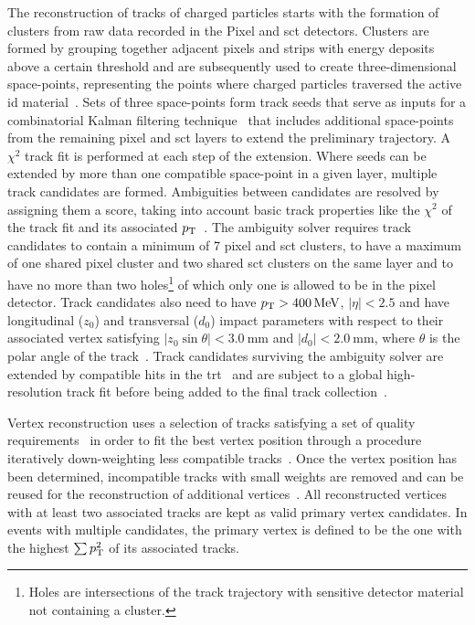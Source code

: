 The reconstruction of tracks of charged particles starts with the formation of clusters from raw data recorded in the Pixel and \gls{sct} detectors.
Clusters are formed by grouping together adjacent pixels and strips with energy deposits above a certain threshold and are subsequently used to create three-dimensional space-points, representing the points where charged particles traversed the active \gls{id} material~\cite{PERF-2015-08}.
Sets of three space-points form track seeds that serve as inputs for a combinatorial Kalman filtering technique~\cite{Fruhwirth:178627} that includes additional space-points from the remaining pixel and \gls{sct} layers to extend the preliminary trajectory.
A $\chi^2$ track fit is performed at each step of the extension.
Where seeds can be extended by more than one compatible space-point in a given layer, multiple track candidates are formed.
Ambiguities between candidates are resolved by assigning them a score, taking into account basic track properties like the $\chi^2$ of the track fit and its associated $p_{\mathrm{T}}$~\cite{PERF-2015-08}.
The ambiguity solver requires track candidates to contain a minimum of 7 pixel and \gls{sct} clusters, to have a maximum of one shared pixel cluster and two shared \gls{sct} clusters on the same layer and to have no more than two holes\footnote{Holes are intersections of the track trajectory with sensitive detector material not containing a cluster.} of which only one is allowed to be in the pixel detector.
Track candidates also need to have $\pt > \SI{400}{\MeV}$, $\vert\eta\vert < 2.5$ and have longitudinal ($z_0$) and transversal ($d_0$) impact parameters with respect to their associated vertex satisfying $\vert z_0 \sin\theta \vert < \SI{3.0}{\milli\meter}$ and $\vert d_0 \vert < \SI{2.0}{\milli\meter}$, where $\theta$ is the polar angle of the track~\cite{PERF-2015-08}.
Track candidates surviving the ambiguity solver are extended by compatible hits in the \gls{trt}~\cite{Cornelissen:1176900} and are subject to a global high-resolution track fit before being added to the final track collection~\cite{PERF-2015-08}.

Vertex reconstruction uses a selection of tracks satisfying a set of quality requirements~\cite{ATL-PHYS-PUB-2015-026} in order to fit the best vertex position through a procedure iteratively down-weighting less compatible tracks~\cite{PERF-2015-01}. Once the vertex position has been determined, incompatible tracks with small weights are removed and can be reused for the reconstruction of additional vertices~\cite{PERF-2015-01}.
All reconstructed vertices with at least two associated tracks are kept as valid primary vertex candidates. In events with multiple candidates, the primary vertex is defined to be the one with the highest $\sum p_{\mathrm{T}}^2$ of its associated tracks.

